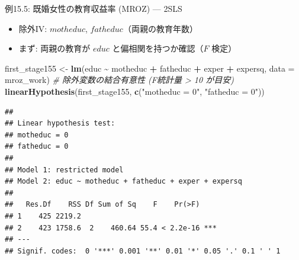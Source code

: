 \documentclass[
  ignorenonframetext,
]{beamer}
\newenvironment{Shaded}{\begin{snugshade}}{\end{snugshade}}
\newcommand{\AttributeTok}[1]{\textcolor[rgb]{0.13,0.29,0.53}{#1}}
\newcommand{\CommentTok}[1]{\textcolor[rgb]{0.56,0.35,0.01}{\textit{#1}}}
\newcommand{\FunctionTok}[1]{\textcolor[rgb]{0.13,0.29,0.53}{\textbf{#1}}}
\newcommand{\NormalTok}[1]{#1}
\newcommand{\OtherTok}[1]{\textcolor[rgb]{0.56,0.35,0.01}{#1}}
\newcommand{\SpecialCharTok}[1]{\textcolor[rgb]{0.81,0.36,0.00}{\textbf{#1}}}
\newcommand{\StringTok}[1]{\textcolor[rgb]{0.31,0.60,0.02}{#1}}
\providecommand{\tightlist}{%
  \setlength{\itemsep}{0pt}\setlength{\parskip}{0pt}}
\begin{document}
\begin{frame}[fragile]{例15.5: 既婚女性の教育収益率 (MROZ) --- 2SLS}
\label{ux4f8b15.5-ux65e2ux5a5aux5973ux6027ux306eux6559ux80b2ux53ceux76caux7387-mroz-2sls}
\begin{itemize}
\tightlist
\item
  除外IV: \(motheduc\), \(fatheduc\)（両親の教育年数）
\item
  まず: 両親の教育が \(educ\) と偏相関を持つか確認（\(F\) 検定）
\end{itemize}

\scriptsize

\begin{Shaded}
\begin{Highlighting}[]
\NormalTok{first\_stage155 }\OtherTok{\textless{}{-}} \FunctionTok{lm}\NormalTok{(educ }\SpecialCharTok{\textasciitilde{}}\NormalTok{ motheduc }\SpecialCharTok{+}\NormalTok{ fatheduc }\SpecialCharTok{+}\NormalTok{ exper }\SpecialCharTok{+}\NormalTok{ expersq,}
                     \AttributeTok{data =}\NormalTok{ mroz\_work)}
\CommentTok{\# 除外変数の結合有意性 (F統計量 \textgreater{} 10 が目安)}
\FunctionTok{linearHypothesis}\NormalTok{(first\_stage155, }\FunctionTok{c}\NormalTok{(}\StringTok{"motheduc = 0"}\NormalTok{, }\StringTok{"fatheduc = 0"}\NormalTok{))}
\end{Highlighting}
\end{Shaded}

\begin{verbatim}
## 
## Linear hypothesis test:
## motheduc = 0
## fatheduc = 0
## 
## Model 1: restricted model
## Model 2: educ ~ motheduc + fatheduc + exper + expersq
## 
##   Res.Df    RSS Df Sum of Sq    F    Pr(>F)    
## 1    425 2219.2                                
## 2    423 1758.6  2    460.64 55.4 < 2.2e-16 ***
## ---
## Signif. codes:  0 '***' 0.001 '**' 0.01 '*' 0.05 '.' 0.1 ' ' 1
\end{verbatim}

\normalsize
\end{frame}
\end{document}

